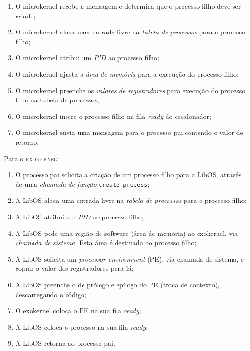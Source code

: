 \begin{exercicio}
\begin{enumerate}
    \item O microkernel recebe a mensagem e determina que o processo filho deve ser criado;

    \item O microkernel aloca uma entrada livre na \textit{tabela de processos} para o processo filho;

    \item O microkernel atribui um \textit{PID} ao processo filho;

    \item O microkernel ajusta a \textit{área de memória} para a execução do processo filho;

    \item O microkernel preenche os \textit{valores de registradores} para execução do processo filho na tabela de processos;

    \item O microkernel insere o processo filho na fila \textit{ready} do escalonador;

    \item O microkernel envia uma mensagem para o processo pai contendo o valor de retorno.
  \end{enumerate}

  Para o \textsc{exokernel}:
  \begin{enumerate}
    \item O processo pai solicita a criação de um processo filho para a LibOS, através de uma \textit{chamada de função} \texttt{create process};

    \item A LibOS aloca uma entrada livre na \textit{tabela de processos} para o processo filho;

    \item A LibOS atribui um \textit{PID} ao processo filho;

    \item A LibOS pede uma região de software (área de memória) ao exokernel, via \textit{chamada de sistema}. Esta área é destinada ao processo filho;

    \item A LibOS solicita um \textit{processor environment} (PE), via chamada de sistema, e copiar o valor dos registradores para lá;

    \item A LibOS preenche o de prólogo e epílogo do PE (troca de contexto), descarregando o código;

    \item O exokernel coloca o PE na sua fila \textit{ready};

    \item A LibOS coloca o processo na sua fila \textit{ready};

    \item A LibOS retorna ao processo pai.
  \end{enumerate}

\end{exercicio}
